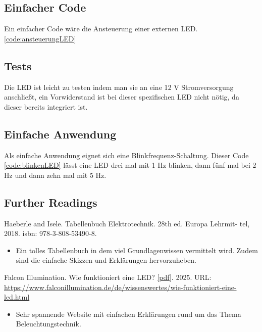 \subsection{Einfacher Code}
Ein einfacher Code wäre die Ansteuerung einer externen LED.\ref{code:ansteuerungLED}
\begin{code}[H]
	\caption{Einfacher Code zur Ansteuerung einer externen LED	}
	\label{code:ansteuerungLED}
\end{code}

\subsection{Tests}
Die LED ist leicht zu testen indem man sie an eine 12 V Stromversorgung anschließt, ein Vorwiderstand ist bei dieser spezifischen LED nicht nötig, da dieser bereits integriert ist.

\subsection{Einfache Anwendung}
Als einfache Anwendung eignet sich eine Blinkfrequenz-Schaltung. Dieser Code \ref{code:blinkenLED} lässt eine LED drei mal mit 1 Hz blinken, dann fünf mal bei 2 Hz und dann zehn mal mit 5 Hz.
\begin{code}[H]
	\caption{Einfacher Code zum Blinken einer externen LED	}
	\label{code:blinkenLED}
\end{code}

\subsection{Further Readings}
Haeberle and Isele. Tabellenbuch Elektrotechnik. 28th ed. Europa Lehrmit-
tel, 2018. isbn: 978-3-808-53490-8.\cite{Haeberle:2018}
\begin{itemize}
	\item Ein tolles Tabellenbuch in dem viel Grundlagenwissen vermittelt wird. Zudem sind die einfache Skizzen und Erklärungen hervorzuheben.
\end{itemize}

Falcon Illumination. Wie funktioniert eine LED? {\textcolor{blue}{\href{../../../MLbib/falconOnline.pdf}{[pdf]}}}. 2025.  
URL: \url{https://www.falconillumination.de/de/wissenswertes/wie-funktioniert-eine-led.html} \cite{Falcon:2025}
\begin{itemize}
	\item Sehr spannende Website mit einfachen Erklärungen rund um das Thema Beleuchtungstechnik.
\end{itemize}